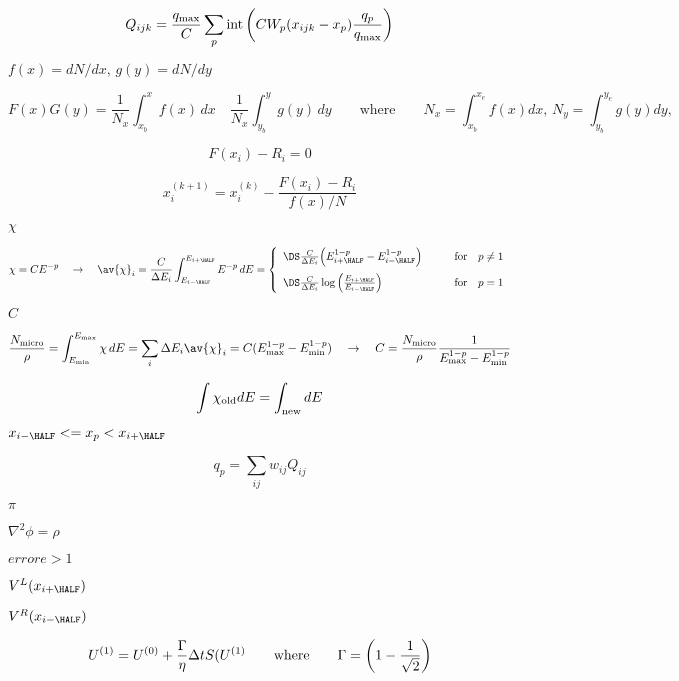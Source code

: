 \documentclass{article}
\begin{document}
\[
   Q_{ijk} = \frac{q_{\max}}{C} \sum_p {\rm int}\left(C
             W_p(x_{ijk}-x_p) \frac{q_p}{q_{\max}}\right)
\]
\pagebreak

$ f(x) = dN/dx,\,g(y) = dN/dy $
\pagebreak

\[
   F(x)G(y) = \frac{1}{N_x}\int_{x_b}^{x} f(x)\,dx\quad
              \frac{1}{N_x}\int_{y_b}^{y} g(y)\,dy
   \qquad\mathrm{where}\qquad
   N_x = \int_{x_b}^{x_e} f(x) dx,\,
   N_y = \int_{y_b}^{y_e} g(y) dy,\,
 \]
\pagebreak

\[
   F(x_i) - R_i = 0
 \]
\pagebreak

\[
     x_i^{(k+1)} = x_i^{(k)} - \frac{F(x_i) - R_i}{f(x)/N} 
 \]
\pagebreak

$ \chi $
\pagebreak

\[
    \chi = CE^{-p}\quad\rightarrow\quad
    \av{\chi}_i = \frac{C}{\Delta E_i}
                  \int_{E_{i-\HALF}}^{E_{i+\HALF}} E^{-p}\, dE
                        =
    \left\{\begin{array}{ll}
       \DS \frac{C}{\Delta E_i}
          \Big(E^{1-p}_{i+\HALF} - E^{1-p}_{i-\HALF}\Big)
       & \qquad {\rm for} \quad p \ne 1
       \\ \noalign{\medskip}
       \DS \frac{C}{\Delta E_i}
            \log\left(\frac{E_{i+\HALF}}{E_{i-\HALF}}\right)
       & \qquad {\rm for} \quad p = 1
    \end{array}\right.
\]
\pagebreak

$ C $
\pagebreak

\[
  \frac{N_{\rm micro}}{\rho} = \int_{E_{\min}}^{E_{\max}} \chi\, dE = \sum_i \Delta E_i\av{\chi}_i
    = C (E_{\max}^{1-p} - E_{\min}^{1-p})
    \quad\rightarrow\quad
    C = \frac{N_{\rm micro}}{\rho}\frac{1}{E_{\max}^{1-p} - E_{\min}^{1-p}}
\]
\pagebreak

\[ \int \chi_{\rm old} dE = \int_{\rm new} dE \]
\pagebreak

$ x_{i-\HALF} <= x_p < x_{i+\HALF} $
\pagebreak

\[
     q_p = \sum_{ij} w_{ij} Q_{ij}
\]
\pagebreak

$ \pi $
\pagebreak

$ \nabla^2\phi = \rho $
\pagebreak

$ errore > 1 $
\pagebreak

$ V^L(x_{i+\HALF}) $
\pagebreak

$ V^R(x_{i-\HALF}) $
\pagebreak

\[
   U^{(1)} = U^{(0)} + \frac{\Gamma}{\eta}\Delta tS(U^{(1)}
   \qquad{\rm where}\qquad \Gamma = \left(1 - \frac{1}{\sqrt{2}}\right)
\]
\pagebreak
\end{document}
